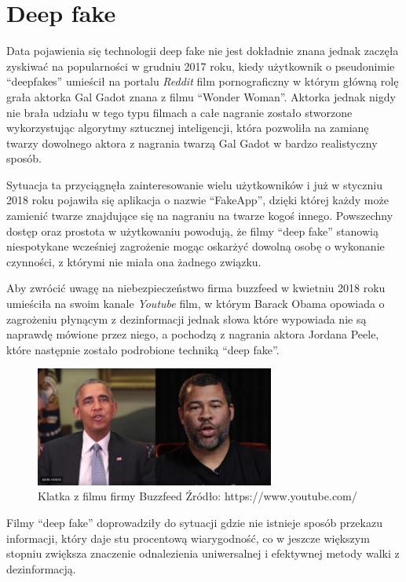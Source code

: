 \section{Deep fake}

Data pojawienia się technologii deep fake nie jest dokładnie znana jednak zaczęła zyskiwać na popularności 
w grudniu 2017 roku, kiedy użytkownik o pseudonimie ``deepfakes'' umieścił na portalu \emph{Reddit} film
pornograficzny w którym główną rolę grała aktorka Gal Gadot znana z filmu ``Wonder Woman''. Aktorka jednak 
nigdy nie brała udziału w tego typu filmach a całe nagranie zostało stworzone wykorzystując algorytmy sztucznej
inteligencji, która pozwoliła na zamianę twarzy dowolnego aktora z nagrania twarzą Gal Gadot w bardzo realistyczny sposób.

Sytuacja ta przyciągnęła zainteresowanie wielu użytkowników i już w styczniu 2018 roku pojawiła się aplikacja o nazwie
``FakeApp'', dzięki której każdy może zamienić twarze znajdujące się na nagraniu na twarze kogoś innego.
Powszechny dostęp oraz prostota w użytkowaniu powodują, że filmy ``deep fake'' stanowią niespotykane wcześniej zagrożenie
mogąc oskarżyć dowolną osobę o wykonanie czynności, z którymi nie miała ona żadnego związku. 

Aby zwrócić uwagę na niebezpieczeństwo firma buzzfeed w kwietniu 2018 roku umieściła na swoim kanale \emph{Youtube} film, w którym Barack Obama opowiada 
o zagrożeniu płynącym z dezinformacji jednak słowa które wypowiada nie są naprawdę mówione przez niego, a pochodzą
z nagrania aktora Jordana Peele, które następnie zostało podrobione techniką ``deep fake''.

\begin{figure}[h!]
    \centering
    \includegraphics[width=0.7\textwidth]{./Img/peele.jpg}
    \caption{Klatka z filmu firmy Buzzfeed Źródło: https://www.youtube.com/}
\end{figure}

Filmy ``deep fake'' doprowadziły do sytuacji gdzie nie istnieje sposób przekazu informacji, który daje stu procentową wiarygodność,
co w jeszcze większym stopniu zwiększa znaczenie odnalezienia uniwersalnej i efektywnej metody walki z dezinformacją. 